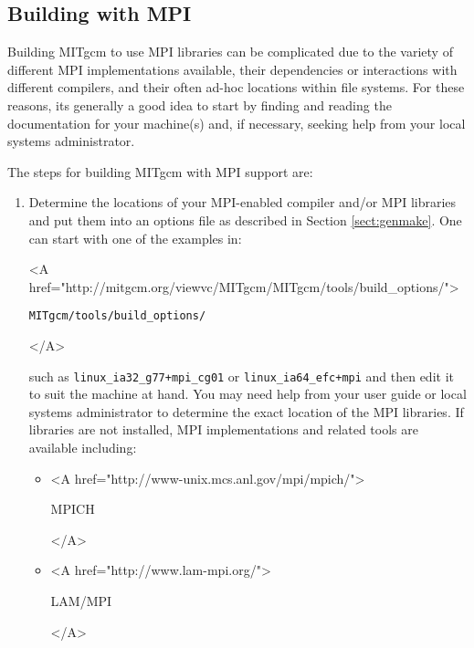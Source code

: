 \subsection{Building with MPI}
\label{sect:mpi-build}

Building MITgcm to use MPI libraries can be complicated due to the
variety of different MPI implementations available, their dependencies
or interactions with different compilers, and their often ad-hoc
locations within file systems.  For these reasons, its generally a
good idea to start by finding and reading the documentation for your
machine(s) and, if necessary, seeking help from your local systems
administrator.

The steps for building MITgcm with MPI support are:
\begin{enumerate}
  
\item Determine the locations of your MPI-enabled compiler and/or MPI
  libraries and put them into an options file as described in Section
  \ref{sect:genmake}.  One can start with one of the examples in:
  \begin{rawhtml} <A
    href="http://mitgcm.org/viewvc/MITgcm/MITgcm/tools/build_options/">
  \end{rawhtml}
  \begin{center}
    \texttt{MITgcm/tools/build\_options/}
  \end{center}
  \begin{rawhtml} </A> \end{rawhtml}
  such as \texttt{linux\_ia32\_g77+mpi\_cg01} or
  \texttt{linux\_ia64\_efc+mpi} and then edit it to suit the machine at
  hand.  You may need help from your user guide or local systems
  administrator to determine the exact location of the MPI libraries.
  If libraries are not installed, MPI implementations and related
  tools are available including:
  \begin{itemize}
  \item \begin{rawhtml} <A
      href="http://www-unix.mcs.anl.gov/mpi/mpich/">
    \end{rawhtml}
    MPICH
    \begin{rawhtml} </A> \end{rawhtml}

  \item \begin{rawhtml} <A
      href="http://www.lam-mpi.org/">
    \end{rawhtml}
    LAM/MPI
    \begin{rawhtml} </A> \end{rawhtml}


\end{itemize}
\end{enumerate}
